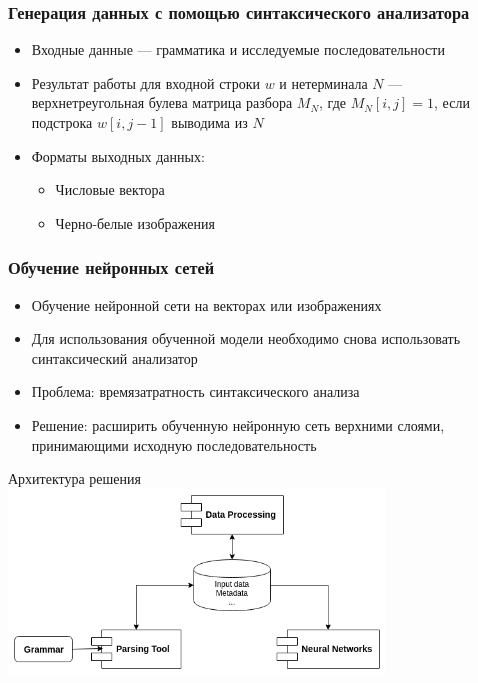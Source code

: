 \documentclass{beamer}
\begin{document}
\begin{frame}\frametitle{Генерация данных с помощью синтаксического анализатора}
\begin{itemize}
    \item Входные данные --- грамматика и исследуемые последовательности
    \item Результат работы для входной строки $w$ и нетерминала $N$ --- верхнетреугольная булева матрица разбора $M_N$, где $M_N [i,j] = 1$, если подстрока $w[i,j-1]$ выводима из $N$
    \item Форматы выходных данных:
    \begin{itemize}
        \item Числовые вектора
        \item Черно-белые изображения
    \end{itemize}
\end{itemize}
\end{frame}

\begin{frame}\frametitle{Обучение нейронных сетей}
    \begin{itemize}
        \item Обучение нейронной сети на векторах или изображениях
        \item Для использования обученной модели необходимо снова использовать синтаксический анализатор
        \item Проблема: времязатратность синтаксического анализа
        \item Решение: расширить обученную нейронную сеть верхними слоями, принимающими исходную последовательность
    \end{itemize}
\end{frame}

\begin{frame}{Архитектура решения}
\vspace{6mm}
\hspace*{6mm}
\includegraphics[width=10cm]{pics/arch.png}    
\end{frame}
\end{document}

